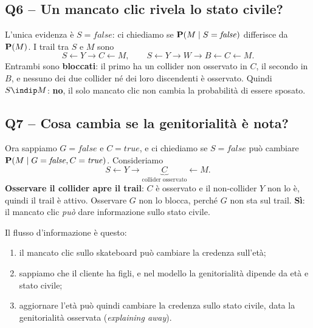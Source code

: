 
\subsection*{Q6 -- Un mancato clic rivela lo stato civile?}

L'unica evidenza è $S=\mathit{false}$: ci chiediamo se $\mathbf{P}(M\mid S=\mathit{false})$
differisce da $\mathbf{P}(M)$. I trail tra $S$ e $M$ sono
\[
  S\leftarrow Y\to C\leftarrow M,
  \qquad
  S\leftarrow Y\to W\to B\leftarrow C\leftarrow M.
\]
Entrambi sono \textbf{bloccati}: il primo ha un collider non osservato in $C$,
il secondo in $B$, e nessuno dei due collider né dei loro discendenti è
osservato. Quindi $S\indip M$: \textbf{no}, il solo mancato clic non cambia la
probabilità di essere sposato.

\subsection*{Q7 -- Cosa cambia se la genitorialità è nota?}

Ora sappiamo $G=\mathit{false}$ e $C=\mathit{true}$, e ci chiediamo se
$S=\mathit{false}$ può cambiare $\mathbf{P}(M\mid G=\mathit{false},C=\mathit{true})$.
Consideriamo
\[
  S\leftarrow Y\to \underbrace{C}_{\text{collider osservato}}\leftarrow M.
\]
\textbf{Osservare il collider apre il trail}: $C$ è osservato e il non-collider
$Y$ non lo è, quindi il trail è attivo. Osservare $G$ non lo blocca, perché $G$
non sta sul trail. \textbf{Sì}: il mancato clic \emph{può} dare informazione
sullo stato civile.

Il flusso d'informazione è questo:
\begin{enumerate}
  \item il mancato clic sullo skateboard può cambiare la credenza sull'età;
  \item sappiamo che il cliente ha figli, e nel modello la genitorialità
        dipende da età e stato civile;
  \item aggiornare l'età può quindi cambiare la credenza sullo stato civile,
        data la genitorialità osservata (\emph{explaining away}).
\end{enumerate}

